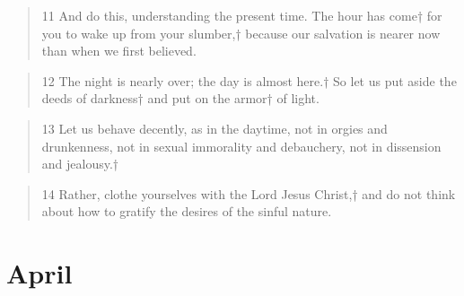 \documentclass[11pt,a4paper]{scrartcl} %
\begin{document}
\begin{verse}
11 And do this, understanding the present time. The hour has come† for you to wake up from your slumber,† because our salvation is nearer now than when we first believed. 
\end{verse}
\begin{verse}
12 The night is nearly over; the day is almost here.† So let us put aside the deeds of darkness† and put on the armor† of light.
\end{verse}
\begin{verse}
13 Let us behave decently, as in the daytime, not in orgies and drunkenness, not in sexual immorality and debauchery, not in dissension and jealousy.† 
\end{verse}
\begin{verse}
14 Rather, clothe yourselves with the Lord Jesus Christ,† and do not think about how to gratify the desires of the sinful nature.
\end{verse}
\section{April}
\end{document}

